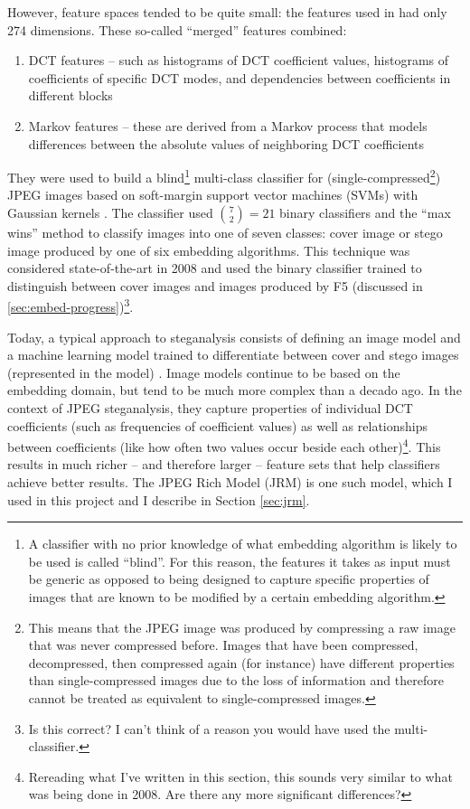 \documentclass[11pt,a4paper,twoside,openright]{report}
\begin{document}
However, feature spaces tended to be quite small: the features used in \cite{2008-paper} had only 274 dimensions. These so-called ``merged'' features combined:
\begin{enumerate}
  \item DCT features -- such as histograms of DCT coefficient values, histograms of coefficients of specific DCT modes, and dependencies between coefficients in different blocks
  \item Markov features -- these are derived from a Markov process that models differences between the absolute values of neighboring DCT coefficients
\end{enumerate}
They were used to build a blind\footnote{A classifier with no prior knowledge of what embedding algorithm is likely to be used is called ``blind''. For this reason, the features it takes as input must be generic as opposed to being designed to capture specific properties of images that are known to be modified by a certain embedding algorithm.} multi-class classifier for (single-compressed\footnote{This means that the JPEG image was produced by compressing a raw image that was never compressed before. Images that have been compressed, decompressed, then compressed again (for instance) have different properties than single-compressed images due to the loss of information and therefore cannot be treated as equivalent to single-compressed images.}) JPEG images based on soft-margin support vector machines (SVMs) with Gaussian kernels \cite{2008-features}. The classifier used $\binom{7}{2}=21$ binary classifiers and the ``max wins'' method to classify images into one of seven classes: cover image or stego image produced by one of six embedding algorithms. This technique was considered state-of-the-art in 2008 and \cite{2008-paper} used the binary classifier trained to distinguish between cover images and images produced by F5 (discussed in \ref{sec:embed-progress})\footnote{Is this correct? I can't think of a reason you would have used the multi-classifier.}.

Today, a typical approach to steganalysis consists of defining an image model and a machine learning model trained to differentiate between cover and stego images (represented in the model) \cite{jrm-paper}. Image models continue to be based on the embedding domain, but tend to be much more complex than a decado ago. In the context of JPEG steganalysis, they capture properties of individual DCT coefficients (such as frequencies of coefficient values) as well as relationships between coefficients (like how often two values occur beside each other)\footnote{Rereading what I've written in this section, this sounds very similar to what was being done in 2008. Are there any more significant differences?}. This results in much richer -- and therefore larger -- feature sets that help classifiers achieve better results. The JPEG Rich Model (JRM) is one such model, which I used in this project and I describe in Section \ref{sec:jrm}.
\end{document}
